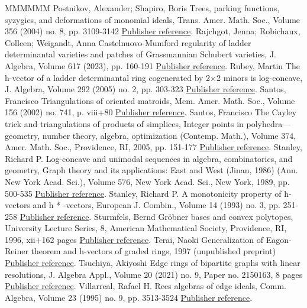 \begin{thebibliography}{MMMMMM}
 Postnikov, Alexander; Shapiro, Boris Trees, parking functions, syzygies, and deformations of monomial ideals, Trans. Amer. Math. Soc., Volume 356 (2004) no. 8, pp. 3109-3142 \href{https://alco.centre-mersenne.org/articles/10.5802/alco.404/#postnikovshapiro}{Publisher reference}.
 Rajchgot, Jenna; Robichaux, Colleen; Weigandt, Anna Castelnuovo-Mumford regularity of ladder determinantal varieties and patches of Grassmannian Schubert varieties, J. Algebra, Volume 617 (2023), pp. 160-191 \href{https://alco.centre-mersenne.org/articles/10.5802/alco.404/#rajchgot2022castelnuovo}{Publisher reference}.
 Rubey, Martin The h-vector of a ladder determinantal ring cogenerated by 2×2 minors is log-concave, J. Algebra, Volume 292 (2005) no. 2, pp. 303-323 \href{https://alco.centre-mersenne.org/articles/10.5802/alco.404/#rubey2005h}{Publisher reference}.
 Santos, Francisco Triangulations of oriented matroids, Mem. Amer. Math. Soc., Volume 156 (2002) no. 741, p. viii+80 \href{https://alco.centre-mersenne.org/articles/10.5802/alco.404/#San02}{Publisher reference}.
 Santos, Francisco The Cayley trick and triangulations of products of simplices, Integer points in polyhedra—geometry, number theory, algebra, optimization (Contemp. Math.), Volume 374, Amer. Math. Soc., Providence, RI, 2005, pp. 151-177 \href{https://alco.centre-mersenne.org/articles/10.5802/alco.404/#santos2005cayley}{Publisher reference}.
 Stanley, Richard P. Log-concave and unimodal sequences in algebra, combinatorics, and geometry, Graph theory and its applications: East and West (Jinan, 1986) (Ann. New York Acad. Sci.), Volume 576, New York Acad. Sci., New York, 1989, pp. 500-535 \href{https://alco.centre-mersenne.org/articles/10.5802/alco.404/#stanley1989log}{Publisher reference}.
 Stanley, Richard P. A monotonicity property of h-vectors and h * -vectors, European J. Combin., Volume 14 (1993) no. 3, pp. 251-258 \href{https://alco.centre-mersenne.org/articles/10.5802/alco.404/#stanley1993}{Publisher reference}.
 Sturmfels, Bernd Gröbner bases and convex polytopes, University Lecture Series, 8, American Mathematical Society, Providence, RI, 1996, xii+162 pages \href{https://alco.centre-mersenne.org/articles/10.5802/alco.404/#sturmfels1996grobner}{Publisher reference}.
 Terai, Naoki Generalization of Eagon-Reiner theorem and h-vectors of graded rings, 1997 (unpublished preprint) \href{https://alco.centre-mersenne.org/articles/10.5802/alco.404/#terai1997generalization}{Publisher reference}.
 Tsuchiya, Akiyoshi Edge rings of bipartite graphs with linear resolutions, J. Algebra Appl., Volume 20 (2021) no. 9, Paper no. 2150163, 8 pages \href{https://alco.centre-mersenne.org/articles/10.5802/alco.404/#tsuchiya2021}{Publisher reference}.
 Villarreal, Rafael H. Rees algebras of edge ideals, Comm. Algebra, Volume 23 (1995) no. 9, pp. 3513-3524 \href{https://alco.centre-mersenne.org/articles/10.5802/alco.404/#villarreal1995rees}{Publisher reference}.
\end{thebibliography}
